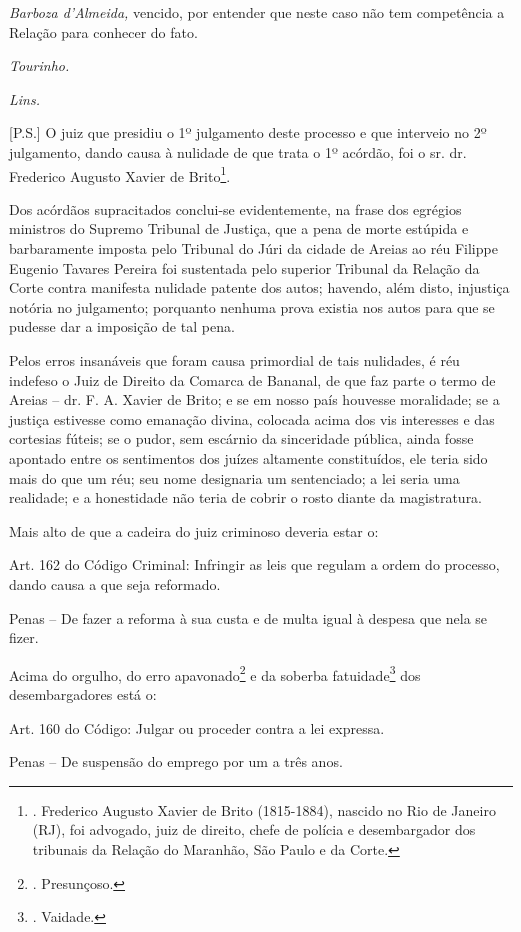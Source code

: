 \emph{Barboza d'Almeida,} vencido, por entender que neste caso não tem
competência a Relação para conhecer do fato.

\emph{Tourinho.}

\emph{Lins.}

{[}P.S.{]} O juiz que presidiu o 1º julgamento deste processo e que
interveio no 2º julgamento, dando causa à nulidade de que trata o 1º
acórdão, foi o sr. dr. Frederico Augusto Xavier de Brito\footnote{.
  Frederico Augusto Xavier de Brito (1815-1884), nascido no Rio de
  Janeiro (RJ), foi advogado, juiz de direito, chefe de polícia e
  desembargador dos tribunais da Relação do Maranhão, São Paulo e da
  Corte.}.

Dos acórdãos supracitados conclui-se evidentemente, na frase dos
egrégios ministros do Supremo Tribunal de Justiça, que a pena de morte
estúpida e barbaramente imposta pelo Tribunal do Júri da cidade de
Areias ao réu Filippe Eugenio Tavares Pereira foi sustentada pelo
superior Tribunal da Relação da Corte contra manifesta nulidade patente
dos autos; havendo, além disto, injustiça notória no julgamento;
porquanto nenhuma prova existia nos autos para que se pudesse dar a
imposição de tal pena.

Pelos erros insanáveis que foram causa primordial de tais nulidades, é
réu indefeso o Juiz de Direito da Comarca de Bananal, de que faz parte o
termo de Areias -- dr. F. A. Xavier de Brito; e se em nosso país
houvesse moralidade; se a justiça estivesse como emanação divina,
colocada acima dos vis interesses e das cortesias fúteis; se o pudor,
sem escárnio da sinceridade pública, ainda fosse apontado entre os
sentimentos dos juízes altamente constituídos, ele teria sido mais do
que um réu; seu nome designaria um sentenciado; a lei seria uma
realidade; e a honestidade não teria de cobrir o rosto diante da
magistratura.

Mais alto de que a cadeira do juiz criminoso deveria estar o:

Art. 162 do Código Criminal: Infringir as leis que regulam a ordem do
processo, dando causa a que seja reformado.

Penas -- De fazer a reforma à sua custa e de multa igual à despesa que
nela se fizer.

Acima do orgulho, do erro apavonado\footnote{. Presunçoso.} e da soberba
fatuidade\footnote{. Vaidade.} dos desembargadores está o:

Art. 160 do Código: Julgar ou proceder contra a lei expressa.

Penas -- De suspensão do emprego por um a três anos.


